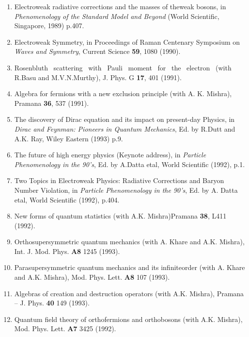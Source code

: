 \begin{enumerate}
\item Electroweak radiative corrections and the masses of the\break weak
bosons, in {\it Phenomenology of the Standard Model and Beyond} (World
Scientific, Singapore, 1989) p.407.

\item Electroweak Symmetry, in Proceedings of Raman Centenary
Symposium on {\it Waves and Symmetry}, Current Science {\bf 59}, 1080
(1990).

\item Rosenbluth \ scattering \ with \ Pauli \ moment \ for \ the \
electron
\ (with R.Basu and M.V.N.Murthy), J. Phys. G {\bf 17}, 401 (1991).

\item Algebra for fermions with a new exclusion principle (with
A. K. Mishra), Pramana {\bf 36}, 537 (1991).

\item The discovery of Dirac equation and its impact on
present-day Physics, in {\it Dirac and Feynman: Pioneers in Quantum
Mechanics}, Ed. by R.Dutt and A.K. Ray, Wiley Eastern (1993) p.9.

\item The future of high energy physics (Keynote address), in\break
{\it Particle Phenomenology in the 90's}, Ed. by
A.Datta etal, World Scientific (1992), p.1.

\item Two Topics in Electroweak Physics: Radiative Corrections
and Baryon Number Violation, in {\it Particle Phenomenology in the
90's}, Ed. by A. Datta etal, World Scientific (1992), p.404.

\item New forms of quantum statistics (with A.K. Mishra)\break Pramana
{\bf 38}, L411 (1992).

\item Orthosupersymmetric quantum mechanics (with A. Khare and
A.K. Mishra), Int. J. Mod. Phys. {\bf A8} 1245 (1993).

\item Parasupersymmetric quantum mechanics and its infinite\break order
(with A. Khare and A.K. Mishra), Mod. Phys. Lett. {\bf A8} 107 (1993). 

\item Algebras of creation and destruction operators (with
A.K. Mishra), Pramana -- J. Phys. {\bf 40} 149 (1993).

\item Quantum field theory of orthofermions and orthobosons (with
A.K. Mishra), Mod. Phys. Lett. {\bf A7} 3425 (1992).


\end{enumerate}
